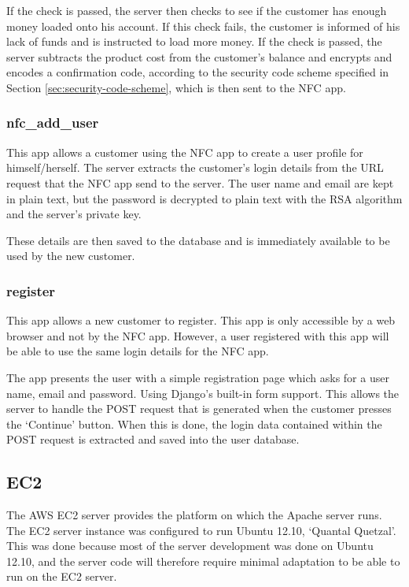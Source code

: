 If the check is passed, the server then checks to see if the customer has enough money loaded
onto his account. If this check fails, the customer is informed of his lack of funds
and is instructed to load more money. If the check is passed, the server subtracts the product
cost from the customer's balance and encrypts and encodes a confirmation code, according to the
security code scheme specified in Section \ref{sec:security-code-scheme}, which is then sent
to the NFC app. 

\subsubsection{nfc\_add\_user}

This app allows a customer using the NFC app to create a user profile for himself/herself. The
server extracts the customer's login details from the URL request that the NFC app send to the
server. The user name and email are kept in plain text, but the password is decrypted to
plain text with the RSA algorithm and the server's private key.

These details are then saved to the database and is immediately available to be used by the new
customer. 

\subsubsection{register}

This app allows a new customer to register. This app is only accessible by a web browser and
not by the NFC app. However, a user registered with this app will be able to use the same login
details for the NFC app.

The app presents the user with a simple registration page which asks for a user name, email and
password. Using Django's built-in form support. This allows the server to handle the
POST request that is generated when the customer presses the `Continue' button. When this is
done, the login data contained within the POST request is extracted and saved into the user
database. 

\subsection{EC2}

The AWS EC2 server provides the platform on which the Apache
server runs. The EC2 server instance was configured to run
Ubuntu 12.10, `Quantal Quetzal'. This was done because most
of the server development was done on Ubuntu 12.10, and the
server code will therefore require minimal adaptation to be able to run on the EC2 server.

